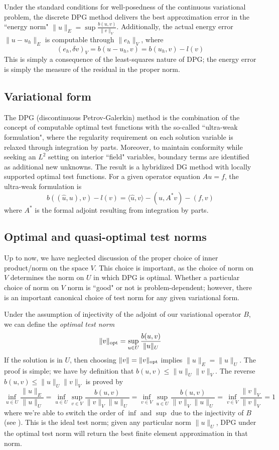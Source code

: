 \documentclass[11pt,onecolumn]{scrartcl}
\begin{document}
Under the standard conditions for well-posedness of the continuous variational problem, the discrete DPG method delivers the best approximation error in the ``energy norm" $\|u\|_E = \sup \frac{b(u,v)}{\|v\|_V}$.  Additionally, the actual energy error $\|u-u_h\|_E$ is computable through $\|e_h\|_V$, where
\[
\left(e_h,\delta v\right)_V = b(u-u_h,v) = b(u_h,v)-l(v)
\]
This is simply a consequence of the least-squares nature of DPG; the energy error is simply the measure of the residual in the proper norm.  

\subsection{Variational form}

The DPG (discontinuous Petrov-Galerkin) method is the combination of the concept of computable optimal test functions with the so-called ``ultra-weak formulation", where the regularity requirement on each solution variable is relaxed through integration by parts.  Moreover, to maintain conformity while seeking an $L^2$ setting on interior ``field" variables, boundary terms are identified as additional new unknowns.  The result is a hybridized DG method with locally supported optimal test functions.  For a given operator equation $Au = f$, the ultra-weak formulation is 
\[
b\left(\left(\widehat{u},u\right),v\right) - l(v) = \langle \widehat{u}, v \rangle - (u,A^*v) - (f,v)
\]
where $A^*$ is the formal adjoint resulting from integration by parts.  

\subsection{Optimal and quasi-optimal test norms}

Up to now, we have neglected discussion of the proper choice of inner product/norm on the space $V$.  This choice is important, as the choice of norm on $V$ determines the norm on $U$ in which DPG is optimal. Whether a particular choice of norm on $V$ norm is ``good" or not is problem-dependent; however, there is an important canonical choice of test norm for any given variational form. 

Under the assumption of injectivity of the adjoint of our variational operator $B$, we can define the \textit{optimal test norm} 
\[
\|v\|_{\rm opt} = \sup_{u\in U}\frac{b(u,v)}{\|u\|_U}
\]
If the solution is in $U$, then choosing $\|v\|=\|v\|_{\rm opt}$ implies $\|u\|_E = \|u\|_U$. The proof is simple; we have by definition that $b(u,v) \leq \|u\|_U\|v\|_V$. The reverse $b(u,v) \leq \|u\|_U\|v\|_V$ is proved by
\[
\inf_{u\in U} \frac{\|u\|_E}{\|u\|_U} = \inf_{u\in U} \sup_{v\in V}\frac{b(u,v)}{\|v\|_V\|u\|_U} = \inf_{v\in V} \sup_{u\in U}\frac{b(u,v)}{\|v\|_V\|u\|_U} = \inf_{v\in V} \frac{\|v\|_V}{\|v\|_V} = 1
\]
where we're able to switch the order of $\inf$ and $\sup$ due to the injectivity of $B$ (see  \cite{BabuskaEquivBrezzi}). This is the ideal test norm; given any particular norm $\|u\|_U$, DPG under the optimal test norm will return the best finite element approximation in that norm. 
\end{document}
